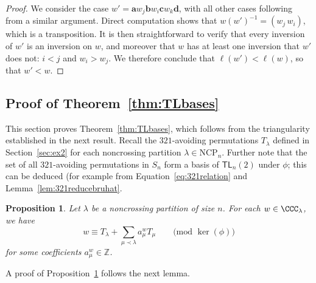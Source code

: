 \documentclass[12pt]{amsart}
\newtheorem{prop}[equation]{Proposition}
\theoremstyle{definition}
\theoremstyle{remark}
\numberwithin{equation}{section}
\newcommand{\ZZ}{\mathbb{Z}}
\newcommand{\TL}{\mathsf{TL}}
\newcommand{\NCP}{\mathrm{NCP}}
\begin{document}
\begin{proof}
We consider the case $w'=\mathbf{a}w_{j}\mathbf{b}w_{i}\mathbf{c}w_{k}\mathbf{d}$, with all other cases following from a similar argument.  
Direct computation shows that $w(w')^{-1}= (w_j\,w_i)$, which is a transposition. 
It is then straightforward to verify that every inversion of $w'$ is an inversion on $w$, and moreover that $w$ has at least one inversion that $w'$ does not: $i < j$ and $w_{i} > w_{j}$.  We therefore conclude that $\ell(w')<\ell(w)$, so that $w' < w$.  
\end{proof}


\subsection{Proof of Theorem~\ref{thm:TLbases}}
\label{sec:basistheoremproof}

This section proves Theorem~\ref{thm:TLbases}, which follows from the triangularity established in the next result.  
Recall the $321$-avoiding permutations $T_{\lambda}$ defined in Section~\ref{sec:ex2} for each noncrossing partition $\lambda \in \NCP_{n}$.  
Further note that the set of all $321$-avoiding permutations in $S_{n}$ form a basis of $\TL_{n}(2)$ under $\phi$; this can be deduced (for example from Equation~\eqref{eq:321relation} and Lemma~\ref{lem:321reducebruhat}.  

\begin{prop}
\label{prop:TLbases}
Let $\lambda$ be a noncrossing partition of size $n$.  For each $w \in \CCC_{\lambda}$, we have
\[
w \equiv T_{\lambda} + \sum_{\mu \prec \lambda} a_{\mu}^{w} T_{\mu} \qquad \text{(mod $\ker(\phi)$)}
\]
for some coefficients $a_{\mu}^{w} \in \ZZ$.
\end{prop}

A proof of Proposition~\ref{prop:TLbases} follows the next lemma.
\end{document}
